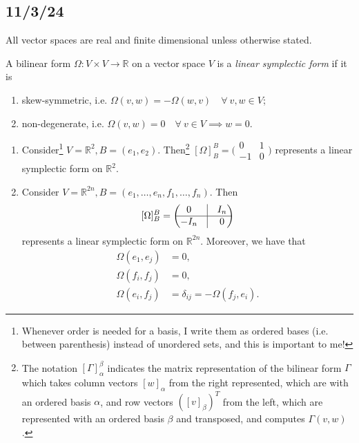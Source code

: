 \subsection*{11/3/24}\label{Sec: 11/3/24}
\begin{Nt}\label{Nt: Vector spaces}
    All vector spaces are real and finite dimensional unless otherwise stated.
\end{Nt}

\begin{Dfn}\label{Dfn: Linear symplectic form}
    A bilinear form $\Omega:V\times V\to \mathbb{R}$ on a vector space $V$ is a \emph{linear symplectic form} if it is
    \begin{enumerate}[label=\DfnLbl]

        \item skew-symmetric, i.e. $\Omega(v,w) = -\Omega(w,v) \quad \forall \ v,w\in V$;

        \item non-degenerate, i.e. $\Omega(v,w) = 0 \quad \forall \ v\in V \implies w=0$.
    \end{enumerate}
\end{Dfn}

\begin{Exp}\leavevmode
    \begin{enumerate}[label=\ExpLbl]

        \item Consider\footnote{Whenever order is needed for a basis, I write them as ordered bases (i.e. between parenthesis) instead of unordered sets, and this is important to me!} $V=\mathbb{R}^2, B = (e_1, e_2)$. Then\footnote{The notation $[\Gamma]_\alpha^\beta$ indicates the matrix representation of the bilinear form $\Gamma$ which takes column vectors $[w]_\alpha$ from the right represented, which are with an ordered basis $\alpha$, and row vectors $([v]_\beta)^T$ from the left, which are represented with an ordered basis $\beta$ and transposed, and computes $\Gamma(v,w)$.} $[\Omega]_B^B=\big(\begin{smallmatrix} 0 &1 \\ -1 &0 \end{smallmatrix}\big)$ represents a linear symplectic form on $\mathbb{R}^2$.

        \item Consider $V=\mathbb{R}^{2n}, B = (e_1,\dots, e_n,f_1,\dots,f_n)$. Then
            \[
                [\Omega]_B^B = \begin{pmatrix} 0 &\vline &I_n \\ \hline -I_n &\vline &0\end{pmatrix}
            \]
            represents a linear symplectic form on $\mathbb{R}^{2n}$. Moreover, we have that
                \begin{align}\label{eq: Symplectic basis}
                    \Omega(e_1,e_j)&=0, \nonumber \\
                    \Omega(f_i,f_j) &= 0, \\
                    \Omega(e_i,f_j) &= \delta_{ij} = -\Omega(f_j,e_i) \nonumber.
                \end{align}
    \end{enumerate}
\end{Exp}


